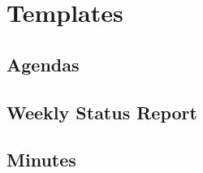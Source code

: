 \chapter{Templates}

\section{Agendas}

\begin{figure}[htb]



\end{figure}

\newpage

\begin{figure}[htb]



\end{figure}

\newpage

\begin{figure}[htb]



\end{figure}

\newpage

\begin{figure}[htb]



\end{figure}

\newpage

\section{Weekly Status Report}

\begin{figure}[htb]



\end{figure}

\newpage

\section{Minutes}

\begin{figure}[htb]



\end{figure}

